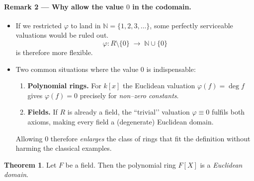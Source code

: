 \documentclass[12pt]{article}
\theoremstyle{definition} %
\newtheorem{theorem}{Theorem}
\theoremstyle{plain} %
\begin{document}
\paragraph*{Remark 2 — Why allow the value \(0\) in the codomain.}
\begin{itemize}
  \item If we restricted \(\varphi\) to land in \(\mathbb N=\{1,2,3,\dots\}\),
        some perfectly serviceable valuations would be ruled out.
        \[
           \varphi:R\setminus\{0\}\;\to\;\mathbb N\cup\{0\}
        \]
        is therefore more flexible.
  \item Two common situations where the value \(0\) is indispensable:
        \begin{enumerate}
          \item \textbf{Polynomial rings.}\;
                For \(k[x]\) the Euclidean valuation \(\varphi(f)=\deg f\)
                gives \(\varphi(f)=0\) precisely for \emph{non–zero constants}.
          \item \textbf{Fields.}\;
                If \(R\) is already a field, the
                “trivial’’ valuation \(\varphi\equiv0\) fulfils both axioms,
                making every field a (degenerate) Euclidean domain.
        \end{enumerate}
        Allowing \(0\) therefore \emph{enlarges} the class of rings that fit
        the definition without harming the classical examples.
\end{itemize}
\begin{theorem}
  Let \(F\) be a field.  
  Then the polynomial ring \(F[X]\) is a \emph{Euclidean domain}.
  \end{theorem}
  
\end{document}
